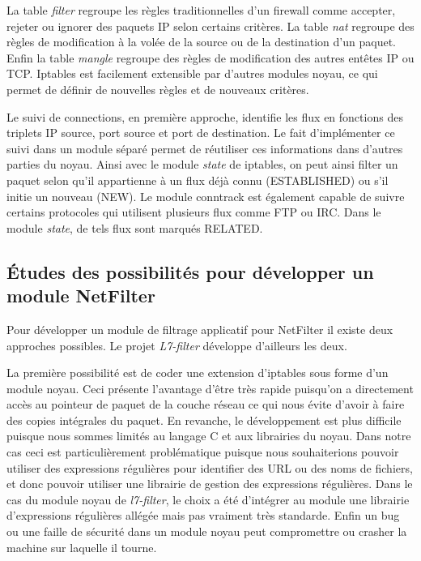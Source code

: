 La table \textit{filter} regroupe les règles traditionnelles d'un
firewall comme accepter, rejeter ou ignorer des paquets IP selon
certains critères. La table \textit{nat} regroupe des règles de
modification à la volée de la source ou de la destination d'un
paquet. Enfin la table \textit{mangle} regroupe des règles de
modification des autres entêtes IP ou TCP. Iptables est facilement
extensible par d'autres modules noyau, ce qui permet de définir de
nouvelles règles et de nouveaux critères.

Le suivi de connections, en première approche, identifie les flux en
fonctions des triplets IP source, port source et port de
destination. Le fait d'implémenter ce suivi dans un module séparé
permet de réutiliser ces informations dans d'autres parties du
noyau. Ainsi avec le module \textit{state} de iptables, on peut ainsi
filter un paquet selon qu'il appartienne à un flux déjà connu
(ESTABLISHED) ou s'il initie un nouveau (NEW). Le module conntrack est
également capable de suivre certains protocoles qui utilisent
plusieurs flux comme FTP ou IRC. Dans le module \textit{state}, de
tels flux sont marqués RELATED.

\subsection{Études des possibilités pour développer un module NetFilter}

Pour développer un module de filtrage applicatif pour NetFilter il
existe deux approches possibles. Le projet \textit{L7-filter}
\cite{l7} développe d'ailleurs les deux.

La première possibilité est de coder une extension d'iptables sous
forme d'un module noyau. Ceci présente l'avantage d'être très rapide
puisqu'on a directement accès au pointeur de paquet de la couche
réseau ce qui nous évite d'avoir à faire des copies intégrales du
paquet. En revanche, le développement est plus difficile puisque nous
sommes limités au langage C et aux librairies du noyau. Dans notre cas
ceci est particulièrement problématique puisque nous souhaiterions
pouvoir utiliser des expressions régulières pour identifier des URL ou
des noms de fichiers, et donc pouvoir utiliser une librairie de
gestion des expressions régulières. Dans le cas du module noyau de
\textit{l7-filter}, le choix a été d'intégrer au module une librairie
d'expressions régulières allégée mais pas vraiment très
standarde. Enfin un bug ou une faille de sécurité dans un module noyau
peut compromettre ou crasher la machine sur laquelle il tourne.

